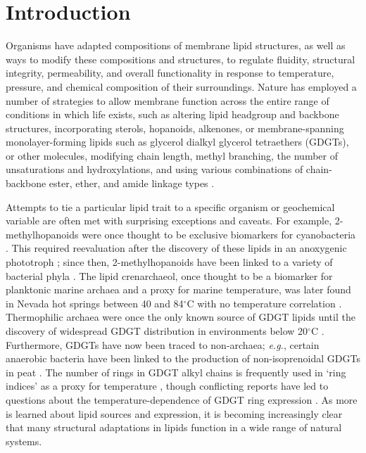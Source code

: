 \section{Introduction}
Organisms have adapted compositions of membrane lipid structures, as well as ways to modify these compositions and structures, to regulate fluidity, structural integrity, permeability, and overall functionality in response to temperature, pressure, and chemical composition of their surroundings. Nature has employed a number of strategies to allow membrane function across the entire range of conditions in which life exists, such as altering lipid headgroup and backbone structures, incorporating sterols, hopanoids, alkenones, or membrane-spanning monolayer-forming lipids such as glycerol dialkyl glycerol tetraethers (GDGTs), or other molecules, modifying chain length, methyl branching, the number of unsaturations and hydroxylations, and using various combinations of chain-backbone ester, ether, and amide linkage types \citep{marlowe1984long, belin2018hopanoid, van2008membrane}.

Attempts to tie a particular lipid trait to a specific organism or geochemical variable are often met with surprising exceptions and caveats. For example, 2-methylhopanoids were once thought to be exclusive biomarkers for cyanobacteria \citep{summons1992methylhopanoids}. This required reevaluation after the discovery of these lipids in an anoxygenic phototroph \citep{rashby2007biosynthesis}; since then, 2-methylhopanoids have been linked to a variety of bacterial phyla \citep{ricci2014diverse}. The lipid crenarchaeol, once thought to be a biomarker for planktonic marine archaea and a proxy for marine temperature, was later found in Nevada hot springs between 40 and 84$^{\circ}$C with no temperature correlation \citep{pearson2004nonmarine}. Thermophilic archaea were once the only known source of GDGT lipids until the discovery of widespread GDGT distribution in environments below 20$^{\circ}$C \citep{schouten2000widespread}. Furthermore, GDGTs have now been traced to non-archaea; \textit{e.g.}, certain anaerobic bacteria have been linked to the production of non-isoprenoidal GDGTs in peat \citep{weijers2006membrane}. The number of rings in GDGT alkyl chains is frequently used in `ring indices' as a proxy for temperature \citep{schouten2002distributional, tierney2012gdgt}, though conflicting reports have led to questions about the temperature-dependence of GDGT ring expression \citep{sollich2017heat}. As more is learned about lipid sources and expression, it is becoming increasingly clear that many structural adaptations in lipids function in a wide range of natural systems.

